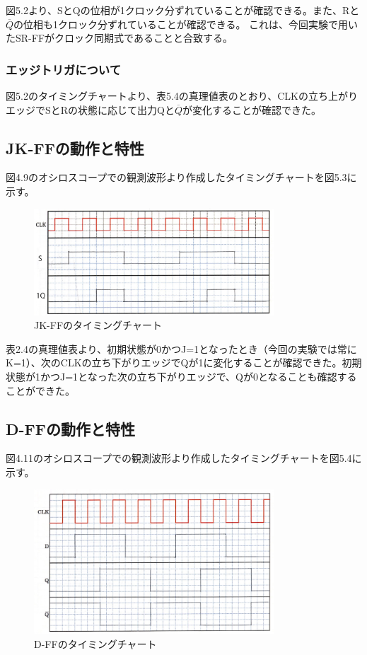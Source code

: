 \documentclass{jlreq}
\numberwithin{equation}{section}
\begin{document}
図5.2より、SとQの位相が1クロック分ずれていることが確認できる。また、Rと$\overline{Q}$の位相も1クロック分ずれていることが確認できる。
これは、今回実験で用いたSR-FFがクロック同期式であることと合致する。

\subsubsection{エッジトリガについて}
図5.2のタイミングチャートより、表5.4の真理値表のとおり、CLKの立ち上がりエッジでSとRの状態に応じて出力Qと$\overline{Q}$が変化することが確認できた。

\subsection{JK-FFの動作と特性}

 図4.9のオシロスコープでの観測波形より作成したタイミングチャートを図5.3に示す。

\begin{figure}[H]
  \centering
  \includegraphics[width=0.8\textwidth]{assets/jkffchart.png}
  \caption{JK-FFのタイミングチャート}
\end{figure}

表2.4の真理値表より、初期状態が0かつJ=1となったとき（今回の実験では常にK=1）、次のCLKの立ち下がりエッジでQが1に変化することが確認できた。初期状態が1かつJ=1となった次の立ち下がりエッジで、Qが0となることも確認することができた。

\subsection{D-FFの動作と特性}

図4.11のオシロスコープでの観測波形より作成したタイミングチャートを図5.4に示す。
\begin{figure}[H]
  \centering
  \includegraphics[width=0.8\textwidth]{assets/dffchart.png}
  \caption{D-FFのタイミングチャート}
\end{figure}
\end{document}
